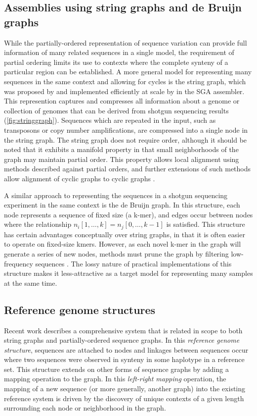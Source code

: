 \documentclass{article}
\begin{document}
\subsection{Assemblies using string graphs and de Bruijn graphs}

While the partially-ordered representation of sequence variation can provide full information of many related sequences in a single model, the requirement of partial ordering limits its use to contexts where the complete synteny of a particular region can be established. A more general model for representing many sequences in the same context and allowing for cycles is the string graph, which was proposed by \cite{myers2005} and implemented efficiently at scale by \cite{simpson2010} in the SGA assembler. This represention captures and compresses all information about a genome or collection of genomes that can be derived from shotgun sequencing results (\ref{fig:stringgraph}). Sequences which are repeated in the input, such as transposons or copy number amplifications, are compressed into a single node in the string graph. The string graph does not require order, although it should be noted that it exhibits a manifold property in that small neighborhoods of the graph may maintain partial order. This property allows local alignment using methods described against partial orders, and further extensions of such methods allow alignment of cyclic graphs to cyclic graphs \cite{myers1989}.

A similar approach to representing the sequences in a shotgun sequencing experiment in the same context is the de Bruijn graph. In this structure, each node represents a sequence of fixed size (a k-mer), and edges occur between nodes where the relationship $n_i[1,\ldots,k] = n_j[0,\ldots,k-1]$ is satisfied. This structure has certain advantages conceptually over string graphs, in that it is often easier to operate on fixed-size kmers. However, as each novel k-mer in the graph will generate a series of new nodes, methods must prune the graph by filtering low-frequency sequences \cite{iqbal2012}. The lossy nature of practical implementations of this structure makes it less-attractive as a target model for representing many samples at the same time.

\subsection{Reference genome structures}

Recent work \cite{paten2014} describes a comprehensive system that is related in scope to both string graphs and partially-ordered sequence graphs. In this \emph{reference genome structure}, sequences are attached to nodes and linkages between sequences occur where two sequences were observed in synteny in some haplotype in a reference set. This structure extends on other forms of sequence graphs by adding a mapping operation to the graph. In this \emph{left-right mapping} operation, the mapping of a new sequence (or more generally, another graph) into the existing reference system is driven by the discovery of unique contexts of a given length surrounding each node or neighborhood in the graph.
\end{document}

